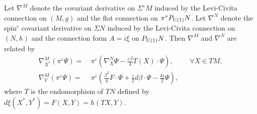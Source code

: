\documentclass[12pt]{amsart}
\begin{document}
\begin{prop} Let ${\nabla}^M$ denote the covariant derivative on $\Sigma ^{\varepsilon} M$ induced by
  the Levi-Civita connection on $(M,g)$ and the flat connection
  on $\pi^*{P_{{{\rm U}}(1)}N}$. Let ${\nabla}^N$ denote the spin$^c$ covariant derivative
  on $\Sigma N$ induced by
  the Levi-Civita connection on $(N,h)$ and the connection
  form $A=i\xi$ on ${P_{{{\rm U}}(1)}N}$. Then ${\nabla}^M$ and ${\nabla}^N$ are related by 
\begin{align}\label{3}
{\nabla}^M_{{X^*}}(\pi^{\varepsilon}{\Psi})=&\ 
\pi^{\varepsilon}({\nabla}^N_X{\Psi}-\tfrac{{\varepsilon}{\beta}}{4}T(X){{\cdot}}{\Psi}),&&
\forall X\in TM,\\
\label{4} {\nabla}^M_{V}(\pi^{\varepsilon}{\Psi})=&\ \pi^{\varepsilon}\left(\tfrac{{\beta}^2}4
F{{\cdot}}{\Psi}+\tfrac{\varepsilon}{2}d{\beta}{{\cdot}}{\Psi}-\tfrac{ki}{2}{\Psi}\right),
\end{align}
where $T$ is the endomorphism of $TN$ defined by $d\xi({{X^*}},{{Y^*}})=F(X,Y)=h(TX,Y)$.
\end{prop}
\end{document}
